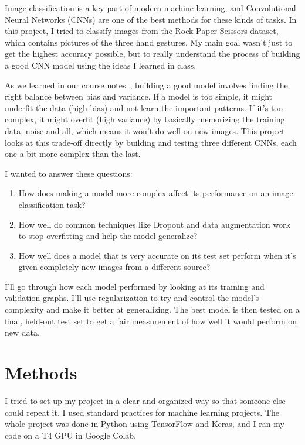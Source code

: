 \documentclass[pdflatex,sn-mathphys-num]{sn-jnl}%
\theoremstyle{thmstyleone}%
\theoremstyle{thmstyletwo}%
\theoremstyle{thmstylethree}%
\begin{document}
Image classification is a key part of modern machine learning, and Convolutional Neural Networks (CNNs) are one of the best methods for these kinds of tasks. In this project, I tried to classify images from the Rock-Paper-Scissors dataset, which contains pictures of the three hand gestures. My main goal wasn't just to get the highest accuracy possible, but to really understand the process of building a good CNN model using the ideas I learned in class.

As we learned in our course notes~\cite{cesa2024smml}, building a good model involves finding the right balance between bias and variance. If a model is too simple, it might underfit the data (high bias) and not learn the important patterns. If it's too complex, it might overfit (high variance) by basically memorizing the training data, noise and all, which means it won't do well on new images. This project looks at this trade-off directly by building and testing three different CNNs, each one a bit more complex than the last.

I wanted to answer these questions:
\begin{enumerate}
    \item How does making a model more complex affect its performance on an image classification task?
    \item How well do common techniques like Dropout and data augmentation work to stop overfitting and help the model generalize?
    \item How well does a model that is very accurate on its test set perform when it's given completely new images from a different source?
\end{enumerate}

I'll go through how each model performed by looking at its training and validation graphs. I'll use regularization to try and control the model's complexity and make it better at generalizing. The best model is then tested on a final, held-out test set to get a fair measurement of how well it would perform on new data.

\section{Methods}\label{sec11}

I tried to set up my project in a clear and organized way so that someone else could repeat it. I used standard practices for machine learning projects. The whole project was done in Python using TensorFlow and Keras, and I ran my code on a T4 GPU in Google Colab.
\end{document}
